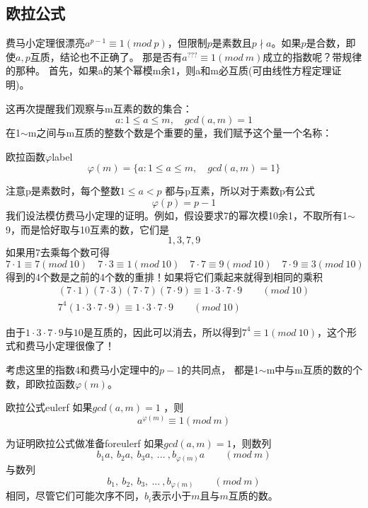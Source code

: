 \subsection{欧拉公式}

费马小定理很漂亮$a^{p-1}\equiv 1(mod\ p)$，但限制$p$是素数且$p\nmid a$。如果$p$是合数，即使$a,p$互质，结论也不正确了。
那是否有$a^{???}\equiv 1(mod\ m)$成立的指数呢？带规律的那种。
首先，如果a的某个幂模m余1，则a和m必互质(可由线性方程定理证明)。

这再次提醒我们观察与m互素的数的集合：
$$
{a:1\leqslant a\leqslant m,\quad gcd(a,m)=1}
$$
{\heiti 在1$\sim$m之间与m互质的整数个数}是个重要的量，我们赋予这个量一个名称：


\begin{definition}{欧拉函数$\varphi$}{label}
$$
\varphi(m)=\{a:1\leqslant a\leqslant m,\quad gcd(a,m)=1\}
$$
\end{definition}

注意p是素数时，每个整数$1\leqslant a<p$ 都与p互素，所以对于素数p有公式
$$
\varphi(p)=p-1
$$
我们设法模仿费马小定理的证明。例如，假设要求7的幂次模10余1，不取所有1$\sim$9，而是恰好取与10互素的数，它们是
$$
1,3,7,9
$$
如果用7去乘每个数可得
$$
7\cdot 1\equiv 7(mod\ 10)\quad 7\cdot 3\equiv 1(mod\ 10)\quad
7\cdot 7\equiv 9(mod\ 10)\quad 7\cdot9\equiv 3(mod\ 10)
$$
{\heiti 得到的4个数是之前的4个数的重排！}如果将它们乘起来就得到相同的乘积
\begin{align*}
(7\cdot 1)(7\cdot 3)(7\cdot7)(7\cdot9)\equiv 1\cdot3\cdot7\cdot9  \qquad  (mod\ 10)  \\
7^4(1\cdot3\cdot7\cdot9)\equiv 1\cdot3\cdot7\cdot9 \qquad (mod\ 10)
\end{align*}

由于$1\cdot3\cdot7\cdot9$与$10$是互质的，因此可以消去，所以得到$7^4\equiv 1(mod\ 10)$，这个形式和费马小定理很像了！

考虑这里的指数4和费马小定理中的$p-1$的共同点， 都是1$\sim$m中与m互质的数的个数，即欧拉函数$\varphi(m)$。


\begin{theorem}{欧拉公式}{eulerf}
如果$gcd(a,m)=1$ ，则
$$
a^{\varphi(m)}\equiv 1 (mod\ m)
$$
\end{theorem}

\begin{lemma}{为证明欧拉公式做准备}{foreulerf}
如果$gcd(a,m)=1$，则数列
$$
b_1a,\ b_2a,\ b_3a,\ ...\ ,b_{\varphi(m)}a  \qquad  (mod\ m)
$$
与数列
$$
b_1,\ b_2,\ b_3,\ ...\ ,b_{\varphi(m)} \qquad (mod\ m)
$$
相同，尽管它们可能次序不同，$b_i$表示小于$m$且与$m$互质的数。
\end{lemma}

